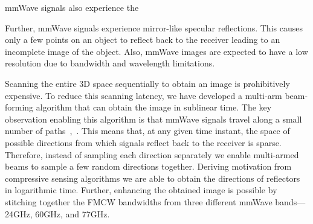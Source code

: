 mmWave signals also experience the 



Further, mmWave signals experience mirror-like specular reflections. This causes only a few points on an object to reflect back to the receiver leading to an incomplete image of the object. Also, mmWave images are expected to have a low resolution due to bandwidth and wavelength limitations.


\fi

\iffalse
Imaging, on the hand, would require performing such ranging in all possible spatial directions. 


This technology performs only unidirectional ranging to determine the distance from the vehicle in front. A transmitter emits frequency modulated continuous wave (FMCW) signals using highly directional beams [\hl{check}] that reflect from objects in front of the car and are received back by a directional [\hl{check}] receiver. However, imaging requires ranging in all directions. An individual FMCW ramp has a minimum delay of about $2 milliseconds$[\hl{check}]~\cite{} which is bottlenecked by the time required by the PLLs to latch on to each frequency in the sweep. This introduces latency of hundreds of milliseconds which gets exacerbated when using very narrow beams for better angular resolution, abating its effectiveness as an imaging system. Reducing this imaging latency is a primary challenge in mmWave imaging. Further, mmWave signals experience mirror-like specular reflections. This causes only a few points on an object to reflect back to the receiver leading to an incomplete image of the object. Also, mmWave images are expected to have a low resolution due to bandwidth and wavelength limitations. %
\fi

Scanning the entire 3D space sequentially to obtain an image is prohibitively expensive. To reduce this scanning latency, we have developed a multi-arm beam-forming algorithm that can obtain the image in sublinear time. The key observation enabling this algorithm is that mmWave signals travel along a small number of paths~\cite{sparse_1},~\cite{sparse_2}. This means that, at any given time instant, the space of possible directions from which signals reflect back to the receiver is sparse. Therefore, instead of sampling each direction separately we enable multi-armed beams to sample a few random directions together. Deriving motivation from compressive sensing algorithms we are able to obtain the directions of reflectors in logarithmic time. Further, enhancing the obtained image is possible by stitching together the FMCW bandwidths from three different mmWave bands---24GHz, 60GHz, and 77GHz.




